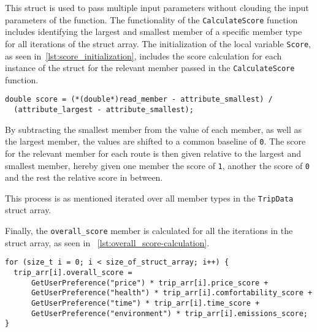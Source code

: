 This struct is used to pass multiple input parameters without clouding the input parameters of the function.
The functionality of the \texttt{CalculateScore} function includes identifying the largest and smallest member of a
specific member type for all iterations of the struct array.
The initialization of the local variable \texttt{Score}, as seen in~\ref{lst:score_initialization}, includes the score
calculation for each instance of the struct for the relevant member passed in the \texttt{CalculateScore} function.

\begin{lstlisting}[caption={Initialization of \texttt{Score}}, label={lst:score_initialization}, captionpos=b]
double score = (*(double*)read_member - attribute_smallest) /
  (attribute_largest - attribute_smallest);
\end{lstlisting}

By subtracting the smallest member from the value of each member, as well as the largest member, the values are shifted
to a common baseline of \texttt{0}.
The score for the relevant member for each route is then given relative to the largest and smallest member, hereby
given one member the score of \texttt{1}, another the score of \texttt{0} and the rest the relative score in between.

This process is as mentioned iterated over all member types in the \texttt{TripData} struct array.

Finally, the \texttt{overall\_score} member is calculated for all the iterations in the struct array, as seen in
~\ref{lst:overall_score-calculation}.

\begin{lstlisting}[caption={Calculation of \texttt{overall\_score}}, label={lst:overall_score-calculation},
    captionpos=b]
for (size_t i = 0; i < size_of_struct_array; i++) {
  trip_arr[i].overall_score =
      GetUserPreference("price") * trip_arr[i].price_score +
      GetUserPreference("health") * trip_arr[i].comfortability_score +
      GetUserPreference("time") * trip_arr[i].time_score +
      GetUserPreference("environment") * trip_arr[i].emissions_score;
}
\end{lstlisting}





